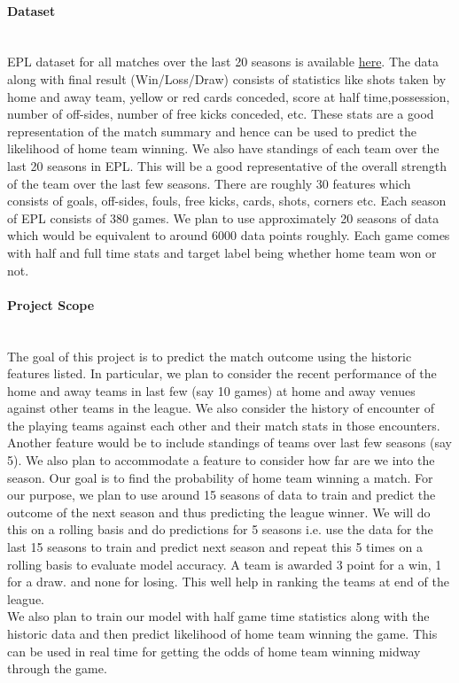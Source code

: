 \documentclass[11pt,letterpaper]{article}
\begin{document}
\paragraph{Dataset}\text{}\\
EPL dataset for all matches over the last 20 seasons is available 
\href{https://www.kaggle.com/saife245/english-premier-league}{here}. The data along with final result (Win/Loss/Draw) consists of statistics like shots taken by home and away team, yellow or red cards conceded, score at half time,possession, number of off-sides, number of free kicks conceded, etc. These stats are a good representation of the match summary and hence can be used to predict the likelihood of home team winning. We also have standings of each team over the last 20 seasons in EPL. This will be a good representative of the overall strength of the team over the last few seasons. 
There are roughly 30 features which consists of goals, off-sides, fouls, free kicks, cards, shots, corners etc. Each season of EPL consists of 380 games. We plan to use approximately 20 seasons of data which would be equivalent to around 6000 data points roughly. Each game comes with half and full time stats and target label being whether home team won or not.

\paragraph{Project Scope}\text{}\\
The goal of this project is to  predict the match outcome using the historic features listed. In particular, we plan to consider the recent performance of the home and away teams in last few (say 10 games) at home and away venues against other teams in the league. We also consider the history of encounter of the playing teams against each other and their match stats in those encounters. Another feature would be to include standings of teams over last few seasons (say 5). We also plan to accommodate a feature to consider how far are we into the season. Our goal is to find the probability of home team winning a match. For our purpose, we plan to use around 15 seasons of data to train and predict the outcome of the next season and thus predicting the league winner. We will do this on a rolling basis and do predictions for 5 seasons i.e. use the data for the last 15 seasons to train and predict next season and repeat this 5 times on a rolling basis to evaluate model accuracy. A team is awarded 3 point for a win, 1 for a draw. and none for losing. This well help in ranking the teams at end of the league.\\
We also plan to train our model with half game time statistics along with the historic data and then predict likelihood of home team winning the game. This can be used in real time for getting the odds of home team winning midway through the game.
\end{document}
